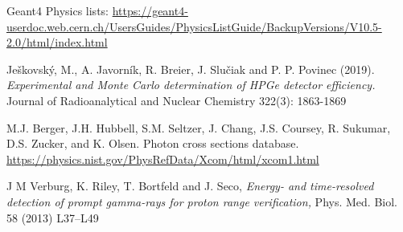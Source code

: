 \documentclass[11pt,a4paper]{article}
\begin{document}
\begin{thebibliography}{9}
Geant4 Physics lists: \url{https://geant4-userdoc.web.cern.ch/UsersGuides/PhysicsListGuide/BackupVersions/V10.5-2.0/html/index.html}


Je\v{s}kovsk\'{y}, M., A. Javorn\'{i}k, R. Breier, J. Slu\v{c}iak and P. P. Povinec (2019). \emph{Experimental and Monte Carlo determination of HPGe detector efficiency.} Journal of Radioanalytical and
Nuclear Chemistry 322(3): 1863-1869



M.J. Berger, J.H. Hubbell, S.M. Seltzer, J. Chang, J.S. Coursey, R. Sukumar, D.S. Zucker, and K. Olsen. Photon cross sections database.
\url{https://physics.nist.gov/PhysRefData/Xcom/html/xcom1.html}

%
%
%
%
%
%

J M Verburg, K. Riley, T. Bortfeld and J. Seco, \emph{Energy- and time-resolved detection of prompt gamma-rays for proton range verification,} Phys. Med. Biol. 58 (2013) L37–L49


\end{thebibliography}
\end{document}
